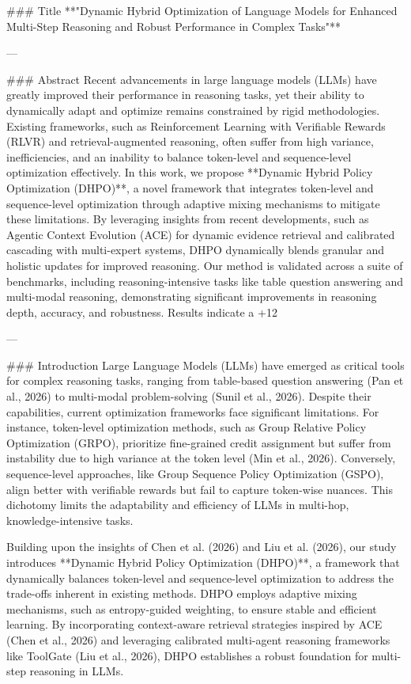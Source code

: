 ### Title  
**"Dynamic Hybrid Optimization of Language Models for Enhanced Multi-Step Reasoning and Robust Performance in Complex Tasks"**

---

### Abstract  
Recent advancements in large language models (LLMs) have greatly improved their performance in reasoning tasks, yet their ability to dynamically adapt and optimize remains constrained by rigid methodologies. Existing frameworks, such as Reinforcement Learning with Verifiable Rewards (RLVR) and retrieval-augmented reasoning, often suffer from high variance, inefficiencies, and an inability to balance token-level and sequence-level optimization effectively. In this work, we propose **Dynamic Hybrid Policy Optimization (DHPO)**, a novel framework that integrates token-level and sequence-level optimization through adaptive mixing mechanisms to mitigate these limitations. By leveraging insights from recent developments, such as Agentic Context Evolution (ACE) for dynamic evidence retrieval and calibrated cascading with multi-expert systems, DHPO dynamically blends granular and holistic updates for improved reasoning. Our method is validated across a suite of benchmarks, including reasoning-intensive tasks like table question answering and multi-modal reasoning, demonstrating significant improvements in reasoning depth, accuracy, and robustness. Results indicate a +12%

---

### Introduction  
Large Language Models (LLMs) have emerged as critical tools for complex reasoning tasks, ranging from table-based question answering (Pan et al., 2026) to multi-modal problem-solving (Sunil et al., 2026). Despite their capabilities, current optimization frameworks face significant limitations. For instance, token-level optimization methods, such as Group Relative Policy Optimization (GRPO), prioritize fine-grained credit assignment but suffer from instability due to high variance at the token level (Min et al., 2026). Conversely, sequence-level approaches, like Group Sequence Policy Optimization (GSPO), align better with verifiable rewards but fail to capture token-wise nuances. This dichotomy limits the adaptability and efficiency of LLMs in multi-hop, knowledge-intensive tasks.

Building upon the insights of Chen et al. (2026) and Liu et al. (2026), our study introduces **Dynamic Hybrid Policy Optimization (DHPO)**, a framework that dynamically balances token-level and sequence-level optimization to address the trade-offs inherent in existing methods. DHPO employs adaptive mixing mechanisms, such as entropy-guided weighting, to ensure stable and efficient learning. By incorporating context-aware retrieval strategies inspired by ACE (Chen et al., 2026) and leveraging calibrated multi-agent reasoning frameworks like ToolGate (Liu et al., 2026), DHPO establishes a robust foundation for multi-step reasoning in LLMs.

